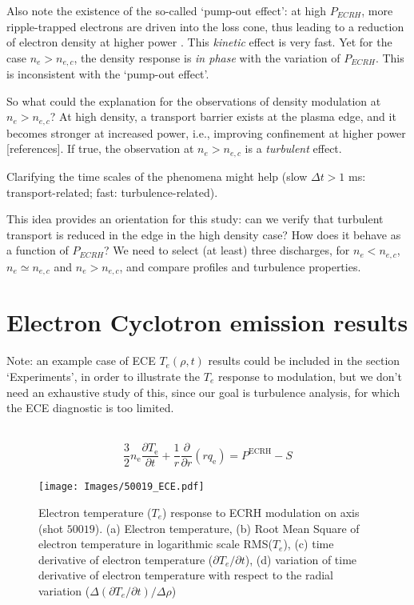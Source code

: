 \documentclass[preprint,12pt,authoryear]{elsarticle}
\begin{document}
Also note the existence of the so-called `pump-out effect': at high $P_{ECRH}$, more ripple-trapped electrons are driven into the loss cone, thus leading to a reduction of electron density at higher power \cite{Castejon:2008}. This {\em kinetic} effect is very fast.
Yet for the case $n_e > n_{e,c}$, the density response is {\em in phase} with the variation of $P_{ECRH}$.
This is inconsistent with the `pump-out effect'.

So what could the explanation for the observations of density modulation at $n_e > n_{e,c}$?
At high density, a transport barrier exists at the plasma edge, and it becomes stronger at increased power, i.e., improving confinement at higher power [references]. If true, the observation at $n_e > n_{e,c}$  is a {\em turbulent} effect. 

Clarifying the time scales of the phenomena might help (slow $\Delta t > 1$ ms: transport-related; fast: turbulence-related).

This idea provides an orientation for this study: can we verify that turbulent transport is reduced in the edge in the high density case? How does it behave as a function of $P_{ECRH}$? We need to select (at least) three discharges, for $n_e < n_{e,c}$, $n_e \simeq n_{e,c}$ and $n_e > n_{e,c}$, and compare profiles and turbulence properties.


\section{Electron Cyclotron emission results}

Note: an example case of ECE $T_e(\rho,t)$ results could be included in the section `Experiments', in order to illustrate the $T_e$ response to modulation, but we don't need an exhaustive study of this, since our goal is turbulence analysis, for which the ECE diagnostic is too limited.

~\protect\cite{S_Eguilior_2003}
\begin{equation}
    \frac{3}{2}n_\mathrm{e}\frac{\partial T_\mathrm{e}}{\partial t} + \frac{1}{r}\frac{\partial }{\partial r}(r q_\mathrm{e}) = P^\mathrm{ECRH} - S
    \label{Eq.Transport_1}
\end{equation}

\begin{figure}[!ht]
   \texttt{[image: Images/50019\_ECE.pdf]}
   \caption{Electron temperature ($T_e$) response to ECRH modulation on axis (shot $50019$). (a) Electron temperature, (b) Root Mean Square of electron temperature in logarithmic scale RMS($T_e$), (c) time derivative of electron temperature ($\partial T_e /\partial t $), (d) variation of time derivative of electron temperature with respect to the radial variation ($\Delta(\partial T_e /\partial t)/\Delta \rho $)}
   \label{Fig:50019_ECE}
\end{figure}
\end{document}
